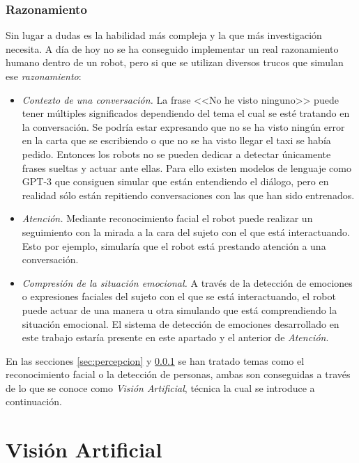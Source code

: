\subsubsection{Razonamiento} 
\label{sec:razonamiento}

Sin lugar a dudas es la habilidad más compleja y la que más investigación necesita. A día de hoy no se ha conseguido implementar un real razonamiento humano dentro de un robot, pero si que se utilizan diversos trucos que simulan ese \textit{razonamiento}:

\begin{itemize}
\item \textit{Contexto de una conversación.} La frase <<No he visto ninguno>> puede tener múltiples significados dependiendo del tema el cual se esté tratando en la conversación. Se podría estar expresando que no se ha visto ningún error en la carta que se escribiendo o que no se ha visto llegar el taxi se había pedido. Entonces los robots no se pueden dedicar a detectar únicamente frases sueltas y actuar ante ellas. Para ello existen modelos de lenguaje como GPT-3 que consiguen simular que están entendiendo el diálogo, pero en realidad sólo están repitiendo conversaciones con las que han sido entrenados.

\item \textit{Atención.} Mediante reconocimiento facial el robot puede realizar un seguimiento con la mirada a la cara del sujeto con el que está interactuando. Esto por ejemplo, simularía que el robot está prestando atención a una conversación.

\item \textit{Compresión de la situación emocional.} A través de la detección de emociones o expresiones faciales del sujeto con el que se está interactuando, el robot puede actuar de una manera u otra simulando que está comprendiendo la situación emocional. El sistema de detección de emociones desarrollado en este trabajo estaría presente en este apartado y el anterior de \textit{Atención}.
\end{itemize}

En las secciones \ref{sec:percepcion} y \ref{sec:razonamiento} se han tratado temas como el reconocimiento facial o la detección de personas, ambas son conseguidas a través de lo que se conoce como \textit{Visión Artificial}, técnica la cual se introduce a continuación.

\section{Visión Artificial}

